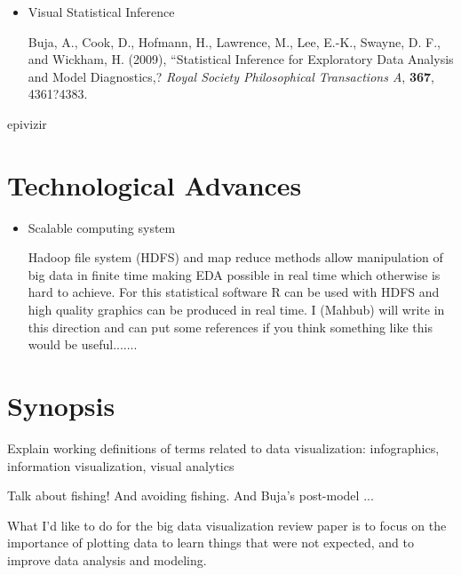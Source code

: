 \documentclass{article}
\begin{document}
\begin{itemize}
\item Visual Statistical Inference

Buja, A., Cook, D., Hofmann, H., Lawrence, M., Lee, E.-K., Swayne, D. F., and Wickham, H. (2009), ``Statistical Inference for Exploratory Data Analysis and Model Diagnostics,? {\em Royal Society Philosophical Transactions A}, {\bf 367}, 4361?4383.


\end{itemize}

epivizir

\section{Technological Advances}

\begin{itemize}
	\item{Scalable computing system}
	
	Hadoop file system (HDFS) and map reduce methods allow manipulation of big data in finite time making EDA possible in real time which otherwise is hard to achieve. For this statistical software R can be used with HDFS and high quality graphics can be produced in real time. I (Mahbub) will write in this direction and can put some references if you think something like this would be useful.......
	
\end{itemize}

\section{Synopsis}

Explain working definitions of terms related to data visualization: infographics, information visualization, visual analytics

Talk about fishing! And avoiding fishing. And Buja's post-model ...

What I'd like to do for the big data visualization review paper is to focus on the importance of plotting data to learn things that were not expected, and to improve data analysis and modeling.
\end{document}
